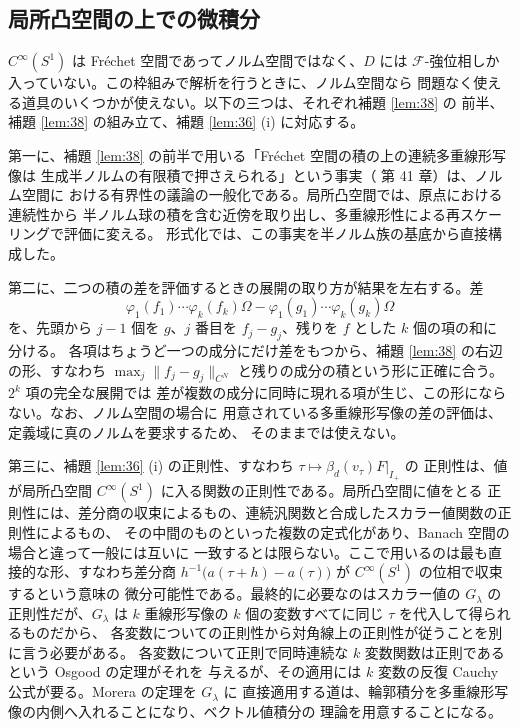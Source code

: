 \documentclass[11pt,a4paper]{article}
\newcommand{\Circ}{S^{1}}
\newcommand{\Fields}{\mathcal{F}}
\newcommand{\Dom}{D}
\newcommand{\CN}[1]{\lVert #1 \rVert_{C^{N}}}
\theoremstyle{definition}
\begin{document}
\subsection{局所凸空間の上での微積分}
\label{sec:lcs}

$C^\infty(\Circ)$ は Fr\'echet 空間であってノルム空間ではなく、$\Dom$ には
$\Fields$-強位相しか入っていない。この枠組みで解析を行うときに、ノルム空間なら
問題なく使える道具のいくつかが使えない。以下の三つは、それぞれ補題 \ref{lem:38} の
前半、補題 \ref{lem:38} の組み立て、補題 \ref{lem:36} (i) に対応する。

第一に、補題 \ref{lem:38} の前半で用いる「Fr\'echet 空間の積の上の連続多重線形写像は
生成半ノルムの有限積で押さえられる」という事実（\cite{Treves} 第 41 章）は、ノルム空間に
おける有界性の議論の一般化である。局所凸空間では、原点における連続性から
半ノルム球の積を含む近傍を取り出し、多重線形性による再スケーリングで評価に変える。
形式化では、この事実を半ノルム族の基底から直接構成した。

第二に、二つの積の差を評価するときの展開の取り方が結果を左右する。差
\[
  \varphi_1(f_1)\cdots\varphi_k(f_k)\Omega - \varphi_1(g_1)\cdots\varphi_k(g_k)\Omega
\]
を、先頭から $j-1$ 個を $g$、$j$ 番目を $f_j - g_j$、残りを $f$ とした $k$ 個の項の和に
分ける。
各項はちょうど一つの成分にだけ差をもつから、補題 \ref{lem:38} の右辺の形、すなわち
$\max_j \CN{f_j - g_j}$ と残りの成分の積という形に正確に合う。$2^k$ 項の完全な展開では
差が複数の成分に同時に現れる項が生じ、この形にならない。なお、ノルム空間の場合に
用意されている多重線形写像の差の評価は、定義域に真のノルムを要求するため、
そのままでは使えない。

第三に、補題 \ref{lem:36} (i) の正則性、すなわち $\tau \mapsto \beta_d(v_\tau)F|_{I_+}$ の
正則性は、値が局所凸空間 $C^\infty(\Circ)$ に入る関数の正則性である。局所凸空間に値をとる
正則性には、差分商の収束によるもの、連続汎関数と合成したスカラー値関数の正則性によるもの、
その中間のものといった複数の定式化があり、Banach 空間の場合と違って一般には互いに
一致するとは限らない。ここで用いるのは最も直接的な形、すなわち差分商
$h^{-1}\bigl(a(\tau+h) - a(\tau)\bigr)$ が $C^\infty(\Circ)$ の位相で収束するという意味の
微分可能性である。最終的に必要なのはスカラー値の $G_\lambda$ の正則性だが、$G_\lambda$ は
$k$ 重線形写像の $k$ 個の変数すべてに同じ $\tau$ を代入して得られるものだから、
各変数についての正則性から対角線上の正則性が従うことを別に言う必要がある。
各変数について正則で同時連続な $k$ 変数関数は正則であるという Osgood の定理がそれを
与えるが、その適用には $k$ 変数の反復 Cauchy 公式が要る。Morera の定理を $G_\lambda$ に
直接適用する道は、輪郭積分を多重線形写像の内側へ入れることになり、ベクトル値積分の
理論を用意することになる。
\end{document}
